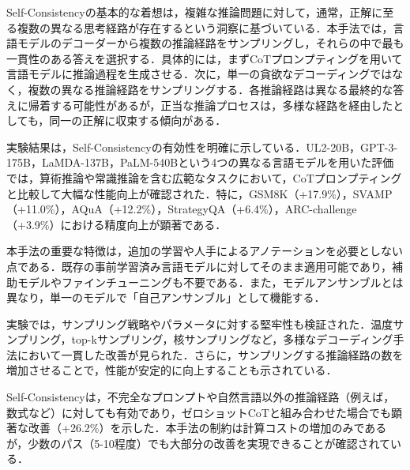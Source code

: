 \documentclass[11pt]{jreport}
\begin{document}
Self-Consistencyの基本的な着想は，複雑な推論問題に対して，通常，正解に至る複数の異なる思考経路が存在するという洞察に基づいている．本手法では，言語モデルのデコーダーから複数の推論経路をサンプリングし，それらの中で最も一貫性のある答えを選択する．具体的には，まずCoTプロンプティングを用いて言語モデルに推論過程を生成させる．次に，単一の貪欲なデコーディングではなく，複数の異なる推論経路をサンプリングする．各推論経路は異なる最終的な答えに帰着する可能性があるが，正当な推論プロセスは，多様な経路を経由したとしても，同一の正解に収束する傾向がある．

実験結果は，Self-Consistencyの有効性を明確に示している．UL2-20B，GPT-3-175B，LaMDA-137B，PaLM-540Bという4つの異なる言語モデルを用いた評価では，算術推論や常識推論を含む広範なタスクにおいて，CoTプロンプティングと比較して大幅な性能向上が確認された．特に，GSM8K（+17.9\%），SVAMP（+11.0\%），AQuA（+12.2\%），StrategyQA（+6.4\%），ARC-challenge（+3.9\%）における精度向上が顕著である．

本手法の重要な特徴は，追加の学習や人手によるアノテーションを必要としない点である．既存の事前学習済み言語モデルに対してそのまま適用可能であり，補助モデルやファインチューニングも不要である．また，モデルアンサンブルとは異なり，単一のモデルで「自己アンサンブル」として機能する．

実験では，サンプリング戦略やパラメータに対する堅牢性も検証された．温度サンプリング，top-kサンプリング，核サンプリングなど，多様なデコーディング手法において一貫した改善が見られた．さらに，サンプリングする推論経路の数を増加させることで，性能が安定的に向上することも示されている．

Self-Consistencyは，不完全なプロンプトや自然言語以外の推論経路（例えば，数式など）に対しても有効であり，ゼロショットCoTと組み合わせた場合でも顕著な改善（+26.2\%）を示した．本手法の制約は計算コストの増加のみであるが，少数のパス（5-10程度）でも大部分の改善を実現できることが確認されている．
\end{document}
